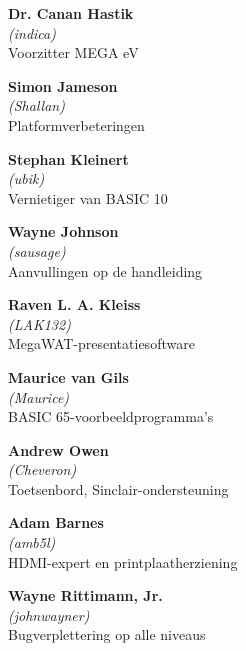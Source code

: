 \begin{mega65thanks}
\columnbreak

\begin{minipage}{\linewidth}
  {\large\bf Dr. Canan Hastik} \\
  \textit{(indica)} \\
  Voorzitter MEGA eV
\end{minipage}

\begin{minipage}{\linewidth}
  {\large\bf Simon Jameson} \\
  \textit{(Shallan)} \\
  Platformverbeteringen
\end{minipage}

\begin{minipage}{\linewidth}
  {\large\bf Stephan Kleinert} \\
  \textit{(ubik)} \\
  Vernietiger van BASIC 10
\end{minipage}

\begin{minipage}{\linewidth}
  {\large\bf Wayne Johnson} \\
  \textit{(sausage)} \\
  Aanvullingen op de handleiding
\end{minipage}

\begin{minipage}{\linewidth}
  {\large\bf Raven L. A. Kleiss} \\
  \textit{(LAK132)} \\
  MegaWAT-presentatiesoftware
\end{minipage}

\begin{minipage}{\linewidth}
  {\large\bf Maurice van Gils }  \\
  \textit{(Maurice)}  \\
  BASIC 65-voorbeeldprogramma's
\end{minipage}

\begin{minipage}{\linewidth}
  {\large\bf Andrew Owen}  \\
  \textit{(Cheveron)} \\
  Toetsenbord, Sinclair-ondersteuning
\end{minipage}

\begin{minipage}{\linewidth}
  {\large\bf Adam Barnes}  \\
  \textit{(amb5l)} \\
  HDMI-expert en printplaatherziening
\end{minipage}

\begin{minipage}{\linewidth}
  {\large\bf Wayne Rittimann, Jr.} \\
  \textit{(johnwayner)} \\
  Bugverplettering op alle niveaus
\end{minipage}

\end{mega65thanks}


